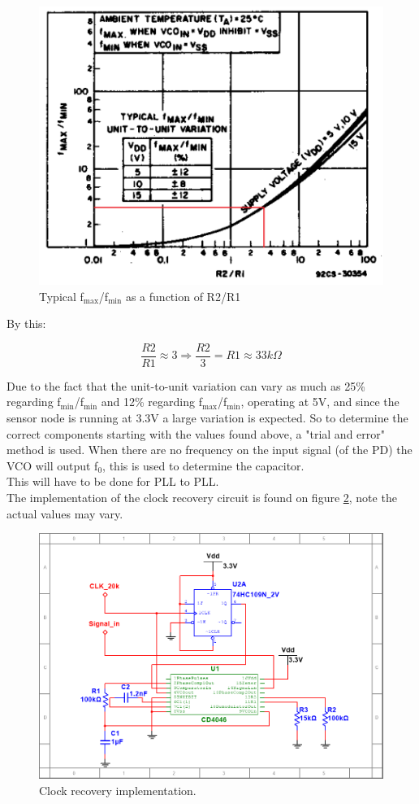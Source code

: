 \begin{figure}[H]
	\centering
	\includegraphics[width=.6\textwidth]{billeder/R1_graph_cd4046}
	\caption{Typical f$_{\text{max}}$/f$_{\text{min}}$ as a function of R2/R1}
	\label{graph:R1}
\end{figure}

By this:

\begin{equation}
	\frac{R2}{R1}\approx3 \Rightarrow \frac{R2}{3}=R1\approx33k\Omega
\end{equation}

Due to the fact that the unit-to-unit variation can vary as much as 25\% regarding f$_{\text{min}}$/f$_{\text{min}}$ and 12\% regarding f$_{\text{max}}$/f$_{\text{min}}$, operating at 5V, and since the sensor node is running at 3.3V a large variation is expected.
So to determine the correct components starting with the values found above, a "trial and error" method is used. When there are no frequency on the input signal (of the PD) the VCO will output f$_{\text{0}}$, this is used to determine the capacitor.\\
This will have to be done for PLL to PLL.\\

The implementation of the clock recovery circuit is found on figure \ref{fig:clock_recovery}, note the actual values may vary.

\begin{figure}[H]
	\centering
	\includegraphics[width=.7\textwidth]{billeder/clock_recovery_imp}
	\caption{Clock recovery implementation.}
	\label{fig:clock_recovery}
\end{figure}


